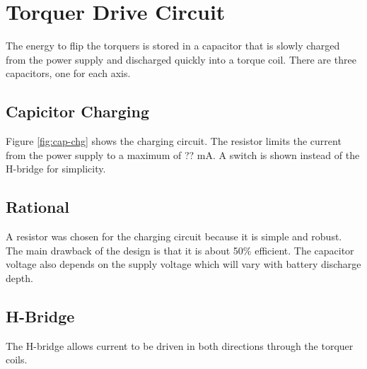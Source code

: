 
\chapter{Torquer Drive Circuit}

The energy to flip the torquers is stored in a capacitor that is slowly charged from the power supply and discharged quickly into a torque coil. There are three capacitors, one for each axis. 

\section{Capicitor Charging}

Figure \autoref{fig:cap-chg} shows the charging circuit. The resistor limits the current from the power supply to a maximum of ?? mA. A switch is shown instead of the H-bridge for simplicity.

\section{Rational}

A resistor was chosen for the charging circuit because it is simple and robust. The main drawback of the design is that it is about 50\% efficient. The capacitor voltage also depends on the supply voltage which will vary with battery discharge depth. 

\section{H-Bridge}

The H-bridge allows current to be driven in both directions through the torquer coils. 


